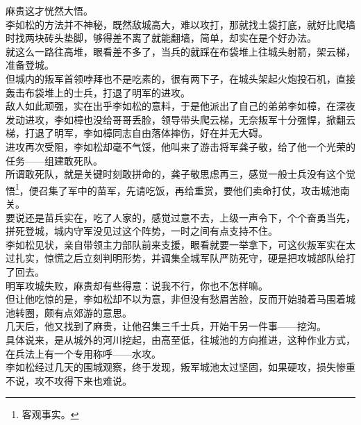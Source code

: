 \begin{multicols}{\theparacolNo}
麻贵这才恍然大悟。\\

李如松的方法并不神秘，既然敌城高大，难以攻打，那就找土袋打底，就好比爬墙时找两块砖头垫脚，够得差不离了就能翻墙，简单，却实在是个好办法。\\

就这么一路往高堆，眼看差不多了，当兵的就踩在布袋堆上往城头射箭，架云梯，准备登城。\\

但城内的叛军首领哱拜也不是吃素的，很有两下子，在城头架起火炮投石机，直接轰击布袋堆上的士兵，打退了明军的进攻。\\

敌人如此顽强，实在出乎李如松的意料，于是他派出了自己的弟弟李如樟，在深夜发动进攻，李如樟也没给哥哥丢脸，领导带头爬云梯，无奈叛军十分强悍，掀翻云梯，打退了明军，李如樟同志自由落体摔伤，好在并无大碍。\\

进攻再次受阻，李如松却毫不气馁，他叫来了游击将军龚子敬，给了他一个光荣的任务——组建敢死队。\\

所谓敢死队，就是关键时刻敢拼命的，龚子敬思虑再三，感觉一般士兵没有这个觉悟\footnote{客观事实。}，便召集了军中的苗军，先请吃饭，再给重赏，要他们卖命打仗，攻击城池南关。\\

要说还是苗兵实在，吃了人家的，感觉过意不去，上级一声令下，个个奋勇当先，拼死登城，城内守军没见过这个阵势，一时之间有点支持不住。\\

李如松见状，亲自带领主力部队前来支援，眼看就要一举拿下，可这伙叛军实在太过扎实，惊慌之后立刻判明形势，并调集全城军队严防死守，硬是把攻城部队给打了回去。\\

明军攻城失败，麻贵却有些得意：说我不行，你也不怎样嘛。\\

但让他吃惊的是，李如松却不以为意，非但没有愁眉苦脸，反而开始骑着马围着城池转圈，颇有点郊游的意思。\\

几天后，他又找到了麻贵，让他召集三千士兵，开始干另一件事——挖沟。\\

具体说来，是从城外的河川挖起，由高至低，往城池的方向推进，这种作业方式，在兵法上有一个专用称呼——水攻。\\

李如松经过几天的围城观察，终于发现，叛军城池太过坚固，如果硬攻，损失惨重不说，攻不攻得下来也难说。\\


\end{multicols}
